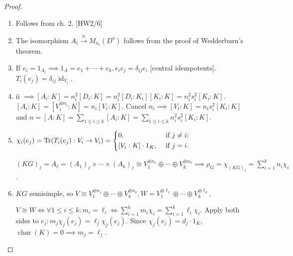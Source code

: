 \documentclass{article}
\theoremstyle{definition}
\theoremstyle{plain}
\theoremstyle{remark}
\begin{document}
    \begin{proof}
        \begin{enumerate}[label=\roman*)]
            \item Follows from ch. 2. [HW2/6]

            \item The isomorphism \(A_i \xrightarrow{\cong} M_{n_i}(D^o)\) follows from the proof of Wedderburn's theorem.
             

            \item If \(e_i = 1_{A_i} \implies 1_A = e_1 + \cdots + e_k , e_i e_j = \delta_{ij} e_i\) [central idempotents]. \(T_i(e_j) = \delta_{ij} \operatorname{id}_{V_i}\).
            
            \item ii \(\implies [A_i : K] = n_i^2 [D_i : K] = n_i^2 [D_i : K_i][K_i : K] = n_i^2 s_i^2 [K_i : K]\). \([A_i : K] = [V_i^{\oplus n_i} : K] = n_i [V_i : K]\). Cancel \(n_i \implies [V_i : K] = n_i s_i^2 [K_i : K]\) and \(n = [A:K] = \sum_{1 \leq i \leq k} [A_i : K] = \sum_{1 \leq i \leq k} n_i^2 s_i^2 [K_i : K]\). 
            
            \item \(\chi_i(e_j) = \Tr(T_i(e_j): V_i \to V_i) = \begin{dcases}
                0, &\text{ if } j\neq i ;\\
                [V_i : K] \cdot 1_K, &\text{ if } j=i.
            \end{dcases}\) 

            \((KG)_\ell = A_\ell = (A_1)_\ell \times \cdots \times (A_k)_\ell \cong V_1^{\oplus n_1} \oplus \cdots \oplus V_k^{\oplus n_k} \implies \rho_G = \chi_{(KG)_\ell} = \sum_{i=1}^k n_i \chi_i\).

            \item \(KG\) semisimple, so \(V \cong V_1^{\oplus n_1} \oplus \cdots \oplus V_k^{\oplus n_k}, W = V_1^{\oplus \ell_1} \oplus \cdots \oplus V_k^{\oplus \ell_k}\).
            
            \(V \cong W \iff \forall 1 \leq i \leq k : m_i = \ell_i \iff  \sum_{i=1}^k m_i \chi_i = \sum_{i=1}^k \ell_i \chi_i\). Apply both sides to \(e_j: m_j \chi_j(e_j) = \ell_j \chi_j(e_j)\). Since \(\chi_j(e_j) = d_j \cdot 1_K\), \(\operatorname{char}(K) = 0 \implies m_j = \ell_j\). 

        \end{enumerate} 
    \end{proof}
\end{document}
